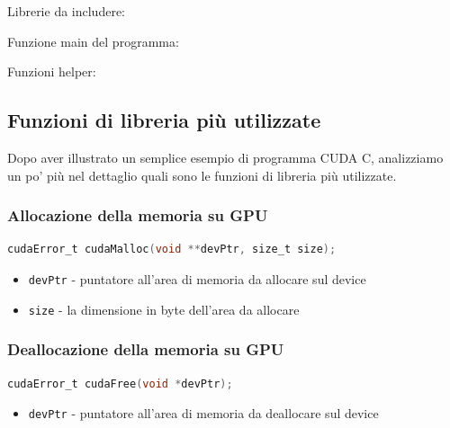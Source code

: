 \noindent Librerie da includere:


\newpage
\noindent Funzione main del programma:


\noindent Funzioni helper:


\subsection{Funzioni di libreria più utilizzate}
\noindent Dopo aver illustrato un semplice esempio di programma CUDA C, analizziamo un po' più nel dettaglio quali sono le funzioni di libreria più utilizzate.

\subsubsection{Allocazione della memoria su GPU}
\begin{lstlisting}[language=C]
    cudaError_t cudaMalloc(void **devPtr, size_t size);
\end{lstlisting}
\begin{itemize}
    \item \texttt{devPtr} - puntatore all'area di memoria da allocare sul device
    \item \texttt{size} - la dimensione in byte dell'area da allocare
\end{itemize}

\subsubsection{Deallocazione della memoria su GPU}
\begin{lstlisting}[language=C]
    cudaError_t cudaFree(void *devPtr);
\end{lstlisting}
\begin{itemize}
    \item \texttt{devPtr} - puntatore all'area di memoria da deallocare sul device
\end{itemize}

